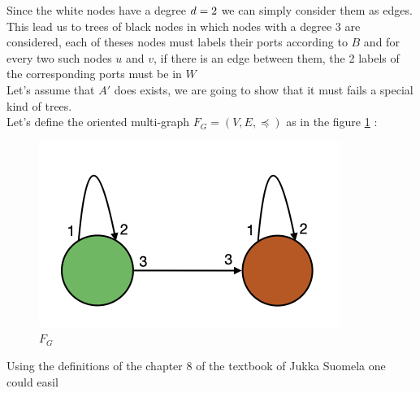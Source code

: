 Since the white nodes have a degree $d = 2$ we can simply consider them as edges. This lead us to trees of black nodes in which nodes with a degree 3 are considered, each of theses nodes must labels their ports according to $B$ and for every two such nodes $u$ and $v$, if there is an edge between them, the 2 labels of the corresponding ports must be in $W$\\
Let's assume that $A'$ does exists, we are going to show that it must fails a special kind of trees.\\
Let's define the oriented multi-graph $F_G = (V, E,\preceq)$ as in the figure  \ref{fig:cv1} :\\
\begin{figure}[htb]
    \centering
    \includegraphics[scale = 0.6]{cover_map.png}
    \caption{$F_G$}
    \label{fig:cv1}
\end{figure}
Using the definitions of the chapter 8 of the textbook of Jukka Suomela \cite{3} one could easil
